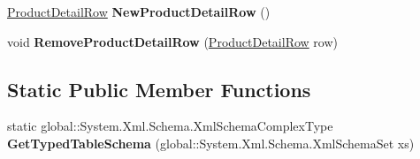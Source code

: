 \begin{DoxyCompactItemize}
\item 
\hyperlink{class_products_1_1_data_1_1ds_sage_1_1_product_detail_row}{Product\+Detail\+Row} {\bfseries New\+Product\+Detail\+Row} ()\hypertarget{class_products_1_1_data_1_1ds_sage_1_1_product_detail_data_table_a467160cfe655059c41b0acae53880f77}{}\label{class_products_1_1_data_1_1ds_sage_1_1_product_detail_data_table_a467160cfe655059c41b0acae53880f77}

\item 
void {\bfseries Remove\+Product\+Detail\+Row} (\hyperlink{class_products_1_1_data_1_1ds_sage_1_1_product_detail_row}{Product\+Detail\+Row} row)\hypertarget{class_products_1_1_data_1_1ds_sage_1_1_product_detail_data_table_a63628ee2c947fa7b9d4e0433e54faee1}{}\label{class_products_1_1_data_1_1ds_sage_1_1_product_detail_data_table_a63628ee2c947fa7b9d4e0433e54faee1}

\end{DoxyCompactItemize}
\subsection*{Static Public Member Functions}
\begin{DoxyCompactItemize}
\item 
static global\+::\+System.\+Xml.\+Schema.\+Xml\+Schema\+Complex\+Type {\bfseries Get\+Typed\+Table\+Schema} (global\+::\+System.\+Xml.\+Schema.\+Xml\+Schema\+Set xs)\hypertarget{class_products_1_1_data_1_1ds_sage_1_1_product_detail_data_table_ab9a9f1d4e834fa543da67cb5fadcde23}{}\label{class_products_1_1_data_1_1ds_sage_1_1_product_detail_data_table_ab9a9f1d4e834fa543da67cb5fadcde23}

\end{DoxyCompactItemize}
